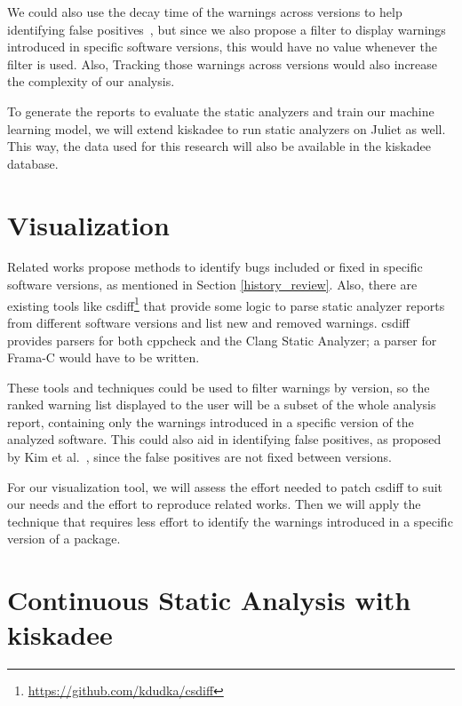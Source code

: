 We could also use the decay time of the warnings across versions to help
identifying false positives~\cite{kim_which_2007, penta_evolution_2008}, but
since we also propose a filter to display warnings introduced in specific
software versions, this would have no value whenever the filter is used.
Also, Tracking those warnings across versions would also increase the
complexity of our analysis.

To generate the reports to evaluate the static analyzers and train our machine
learning model, we will extend kiskadee to run static analyzers on Juliet as
well. This way, the data used for this research will also be available in the
kiskadee database.

\section{Visualization}
\label{sec:visualization}

Related works propose methods to identify bugs included or fixed in specific
software versions, as mentioned in Section \ref{history_review}.
Also, there are existing tools like
csdiff\footnote{\url{https://github.com/kdudka/csdiff}} that provide some
logic to parse static analyzer reports from different software versions and
list new and removed warnings. csdiff provides parsers for both cppcheck and
the Clang Static Analyzer; a parser for Frama-C would have to be written.

These tools and techniques could be used to filter warnings by version, so the
ranked warning list displayed to the user will be a subset of the whole
analysis report, containing only the warnings introduced in a specific version
of the analyzed software. This could also aid in identifying false positives,
as proposed by Kim et al.~\cite{kim_which_2007}, since the false positives are
not fixed between versions.

For our visualization tool, we will assess the effort needed to patch csdiff
to suit our needs and the effort to reproduce related works. Then we will
apply the technique that requires less effort to identify the warnings introduced
in a specific version of a package.


\section{Continuous Static Analysis with kiskadee}
\label{sec:continuous_static_analysis}

